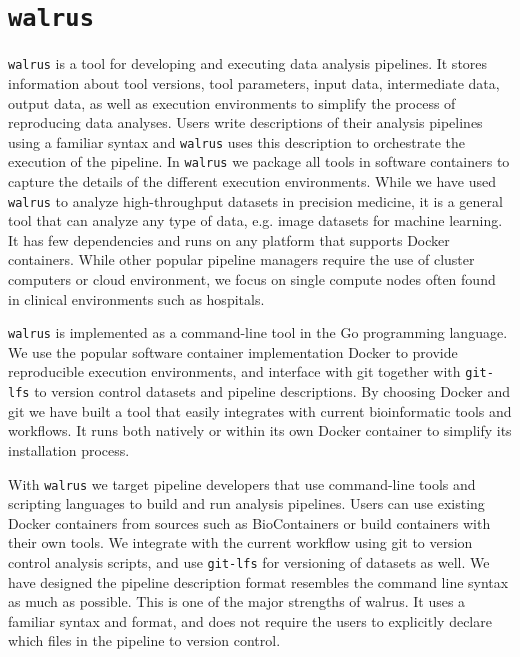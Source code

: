 \section{\texttt{walrus}} 
\texttt{walrus} is a tool for developing and executing data analysis pipelines.
It stores information about tool versions, tool parameters, input data,
intermediate data, output data, as well as execution environments to simplify
the process of reproducing data analyses. Users write descriptions of their
analysis pipelines using a familiar syntax and \texttt{walrus}  uses this
description to orchestrate the execution of the pipeline. In \texttt{walrus}  we
package all tools in software containers to capture the details of the different
execution environments. While we have used \texttt{walrus} to analyze
high-throughput datasets in precision medicine, it is a general tool that can
analyze any type of data, e.g. image datasets for machine learning. It has few
dependencies and runs on any platform that supports Docker containers. While
other popular pipeline managers require the use of cluster computers or cloud
environment, we focus on single compute nodes often found in clinical
environments such as hospitals. 

\texttt{walrus} is implemented as a command-line tool in the Go programming
language. We use the popular software container implementation
Docker\cite{docker} to provide reproducible execution environments, and
interface with git together with \texttt{git-lfs}\cite{gitlfs} to version control
datasets and pipeline descriptions. By choosing Docker and git we have built a
tool that easily integrates with current bioinformatic tools and workflows. It
runs both natively or within its own Docker container to simplify its
installation process.

With \texttt{walrus} we target pipeline developers that use command-line tools
and scripting languages to build and run analysis pipelines. Users can use
existing Docker containers from sources such as
BioContainers\cite{biocontainers} or build containers with their own tools.  We
integrate with the current workflow using git to version control analysis
scripts, and use \texttt{git-lfs} for versioning of datasets as well. We have
designed the pipeline description format resembles the command line syntax as
much as possible. This is one of the major strengths of walrus. It uses a
familiar syntax and format, and does not require the users to explicitly
declare which files in the pipeline to version control. 


